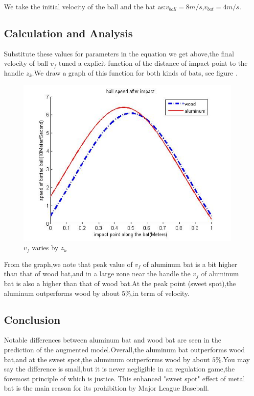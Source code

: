 \documentclass[12pt]{article}
\begin{document}
We take the initial velocity of the ball and the bat as:$v_{ball}=8 m/s$,$v_{bat}=4 m/s$.

\subsection{Calculation and Analysis}
Substitute these values for parameters in the equation we get above,the final velocity of ball $v_f$ tuned a explicit
function of the distance of impact point to the handle $z_k$.We draw a graph of this function for both kinds of bats,
see figure . %

\begin{center}
\begin{figure}[htpb]
\centering
\includegraphics[scale=0.4]{aluminium}
\caption{$v_f$ varies by $z_k$}\label{fig:aluminium}
\end{figure}
\end{center}

From the graph,we note that peak value of $v_f$ of aluminum bat is a bit higher than that of wood bat,and in a large zone
near the handle the $v_f$ of aluminum bat is also a higher than that of wood bat.At the peak point (sweet spot),the
aluminum outperforms wood by about $5\%$,in term of velocity.

\subsection{Conclusion}
Notable differences between aluminum bat and wood bat are seen in the prediction of the augmented model.Overall,the
aluminum bat outperforms wood bat,and at the sweet  spot,the aluminum outperforms wood by about $5\%$.You may say the
difference is small,but it is never negligible in an regulation game,the foremost principle of which is justice.
This enhanced "sweet spot" effect of metal bat is the main reason for its prohibition by Major League Baseball.
\end{document}
